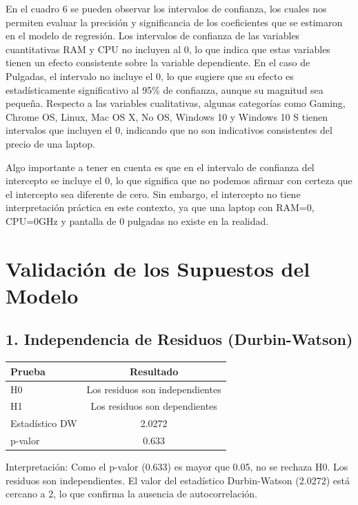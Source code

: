 \documentclass[12pt,a4paper]{article}
\begin{document}
    En el cuadro 6 se pueden observar los intervalos de confianza, los cuales nos permiten evaluar 
la precisión y significancia de los coeficientes que se estimaron en el modelo de regresión. Los 
intervalos de confianza de las variables cuantitativas RAM y CPU no incluyen al 0, lo que indica que estas variables tienen un efecto consistente sobre la variable dependiente. En el caso de Pulgadas, el intervalo no incluye el 0, lo que sugiere que su efecto es estadísticamente significativo al 95\% de confianza, aunque su magnitud sea pequeña. Respecto a las variables cualitativas, algunas categorías como Gaming, Chrome OS, Linux, Mac OS X, No OS, Windows 10 y Windows 10 S tienen intervalos que incluyen el 0, indicando que no son indicativos consistentes del precio de una laptop. 

    Algo importante a tener en cuenta es que en el intervalo de confianza del intercepto se incluye el 0, lo que significa que no podemos afirmar con certeza que el intercepto sea diferente de cero. Sin embargo, el intercepto no tiene interpretación práctica en este contexto, ya que una laptop con RAM=0, CPU=0GHz y pantalla de 0 pulgadas no existe en la realidad.


\section{Validación de los Supuestos del Modelo}

\subsection{1. Independencia de Residuos (Durbin-Watson)}

\begin{table}[H]
\centering
\begin{tabular}{lc}
\toprule
\textbf{Prueba} & \textbf{Resultado} \\
\midrule
H0 & Los residuos son independientes \\
H1 & Los residuos son dependientes \\
Estadístico DW & 2.0272 \\
p-valor & 0.633 \\
\bottomrule
\end{tabular}
\end{table}

Interpretación: Como el p-valor (0.633) es mayor que 0.05, no se rechaza H0. Los residuos son independientes. El valor del estadístico Durbin-Watson (2.0272) está cercano a 2, lo que confirma la ausencia de autocorrelación.
\end{document}
